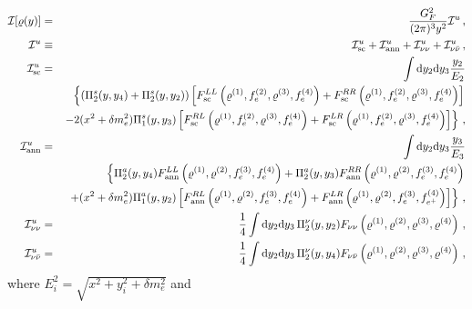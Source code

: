 \documentclass[notitlepage,nofootinbib,showpacs,preprintnumbers,amsmath,amssymb,superscriptaddress,prd,onecolumn]{revtex4-1}
\begin{document}
\begin{eqnarray}
\mathcal{I}[\varrho(y)]
&=&
\frac{G_F^2}{(2\pi)^3y^2}
\mathcal{I}^u\,,
\label{eq:collint}
\\
\mathcal{I}^u
&\equiv&
\mathcal{I}_{\rm sc}^u
+ \mathcal{I}_{\rm ann}^u
+ \mathcal{I}_{\nu\nu}^u
+ \mathcal{I}_{\nu\bar\nu}^u
\,,
\label{eq:unnormcollint}
\\
\mathcal{I}_{\rm sc} ^u
&=&
\int {\rm d}y_2 {\rm d}y_3 \frac{y_2}{E_2}
\label{eq:I_sc}
\\
&&
\left\{\left(\Pi_2^s(y, y_4)+\Pi_2^s(y, y_2)\right)
    \left[
    F_{\rm sc}^{LL}\left(\varrho^{(1)}, f_e^{(2)}, \varrho^{(3)}, f_e^{(4)}\right)
    +F_{\rm sc}^{RR}\left(\varrho^{(1)}, f_e^{(2)}, \varrho^{(3)}, f_e^{(4)}\right)\right]\right.
    \nonumber\\
    &&\left.-2(x^2+\delta m_e^2)\Pi_1^s(y,y_3)
    \left[
     F_{\rm sc}^{RL}\left(\varrho^{(1)}, f_e^{(2)}, \varrho^{(3)}, f_e^{(4)}\right)
    +F_{\rm sc}^{LR}\left(\varrho^{(1)}, f_e^{(2)}, \varrho^{(3)}, f_e^{(4)}\right)
    \right]\nonumber
\right\}\,,
\\
\mathcal{I}_{\rm ann}^u
&=&
\int {\rm d}y_2 {\rm d}y_3 \frac{y_3}{E_3}
\label{eq:I_ann}\\
    &&\left\{\Pi_2^a(y, y_4)F_{\rm ann}^{LL}\left(\varrho^{(1)}, \varrho^{(2)}, f_e^{(3)}, f_e^{(4)}\right)
    +\Pi_2^a(y, y_3)F_{\rm ann}^{RR}\left(\varrho^{(1)}, \varrho^{(2)}, f_e^{(3)}, f_e^{(4)}\right)\right.
\nonumber\\
    &&\left.+ (x^2+\delta m_e^2)\Pi_1^a(y,y_2)
    \left[
    F_{\rm ann}^{RL}\left(\varrho^{(1)}, \varrho^{(2)}, f_e^{(3)}, f_e^{(4)}\right)
    +F_{\rm ann}^{LR}\left(\varrho^{(1)}, \varrho^{(2)}, f_e^{(3)}, f_{e^+}^{(4)}\right)
    \right]\nonumber
\right\}\,,
\\
\mathcal{I}_{\nu\nu} ^u
&=&
\frac{1}{4}
\int {\rm d}y_2 {\rm d}y_3\,
\Pi_2^\nu(y, y_2)
F_{\nu\nu}\left(\varrho^{(1)}, \varrho^{(2)}, \varrho^{(3)}, \varrho^{(4)}\right)
\,,
\label{eq:I_nunu}
\\
\mathcal{I}_{\nu\bar\nu} ^u
&=&
\frac{1}{4}
\int {\rm d}y_2 {\rm d}y_3\,
\Pi_2^\nu(y, y_4)
F_{\nu\bar\nu}\left(\varrho^{(1)}, \varrho^{(2)}, \varrho^{(3)}, \varrho^{(4)}\right)
\label{eq:I_nubarnu}
\,,
\end{eqnarray}
where $E^2_i = \sqrt{x^2+y_i^2+\delta m_e^2}$ and
\end{document}

